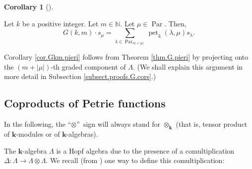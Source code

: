 \documentclass[numbers=enddot,12pt,final,onecolumn,notitlepage]{scrartcl}%
\theoremstyle{definition}
\newtheorem{coro}[theo]{Corollary}
\newenvironment{corollary}[1][]
{\begin{coro}[#1]\begin{leftbar}}
{\end{leftbar}\end{coro}}
\let\sumnonlimits\sum
\renewcommand{\sum}{\sumnonlimits\limits}
\begin{document}
\begin{corollary}
\label{cor.Gkm.pieri}Let $k$ be a positive integer. Let $m\in\mathbb{N}$. Let
$\mu\in\operatorname*{Par}$. Then,%
\[
G\left(  k,m\right)  \cdot s_{\mu}=\sum_{\lambda\in\operatorname*{Par}%
\nolimits_{m+\left\vert \mu\right\vert }}\operatorname*{pet}\nolimits_{k}%
\left(  \lambda,\mu\right)  s_{\lambda}.
\]

\end{corollary}

Corollary \ref{cor.Gkm.pieri} follows from Theorem \ref{thm.G.pieri} by
projecting onto the $\left(  m+\left\vert \mu\right\vert \right)  $-th graded
component of $\Lambda$. (We shall explain this argument in more detail in
Subsection \ref{subsect.proofs.G.cors}.)

\subsection{\label{subsect.thms.coprod}Coproducts of Petrie functions}

In the following, the \textquotedblleft$\otimes$\textquotedblright\ sign will
always stand for $\otimes_{\mathbf{k}}$ (that is, tensor product of
$\mathbf{k}$-modules or of $\mathbf{k}$-algebras).

The $\mathbf{k}$-algebra $\Lambda$ is a Hopf algebra due to the presence of a
comultiplication $\Delta:\Lambda\rightarrow\Lambda\otimes\Lambda$. We recall
(from \cite[\S 2.1]{GriRei}) one way to define this comultiplication:
\end{document}
